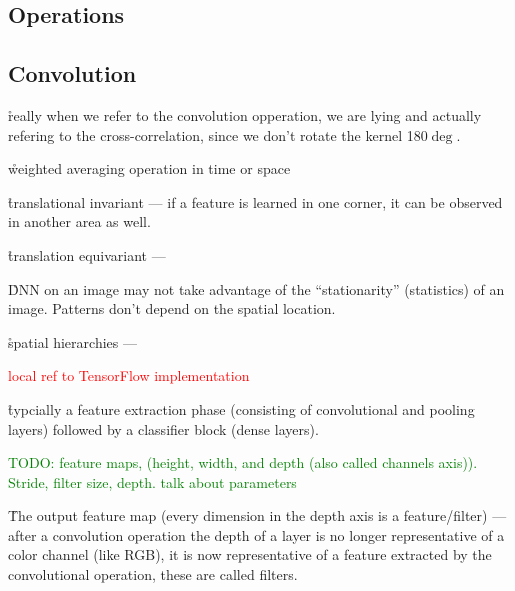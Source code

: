
\subsection{Operations}

\subsection{Convolution}



\r{really when we refer to the convolution opperation, we are lying and actually refering to the cross-correlation, since we don't rotate the kernel 180$\deg$.}


\r{weighted averaging operation in time or space}

\r{translational invariant --- if a feature is learned in one corner, it can be observed in another area as well.}

\r{translation equivariant --- }

\r{DNN on an image may not take advantage of the ``stationarity'' (statistics) of an image. Patterns don't depend on the spatial location.}

\r{spatial hierarchies --- }

\textcolor{red}{local ref to TensorFlow implementation}

\r{typcially a feature extraction phase (consisting of convolutional and pooling layers) followed by a classifier block (dense layers).}

\textcolor{green}{TODO: feature maps, (height, width, and depth (also called channels axis)). Stride, filter size, depth. talk about parameters}

\r{The output feature map (every dimension in the depth axis is a feature/filter) --- after a convolution operation the depth of a layer is no longer representative of a color channel (like RGB), it is now representative of a feature extracted by the convolutional operation, these are called filters.}


